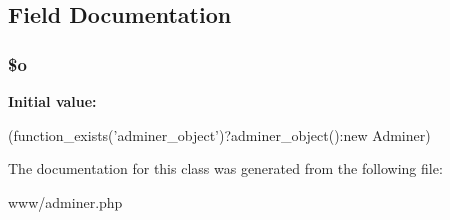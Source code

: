 \subsection{Field Documentation}
\subsubsection[{\$o}]{\setlength{\rightskip}{0pt plus 5cm}\$o}\label{class_adminer_ac6c49291f92291a3cece8066d68e5f5e}
{\bfseries Initial value:}
\begin{DoxyCode}
(function_exists('adminer_object')?adminer_object():new
Adminer)
\end{DoxyCode}


The documentation for this class was generated from the following file:\begin{DoxyCompactItemize}
\item 
www/adminer.php\end{DoxyCompactItemize}

